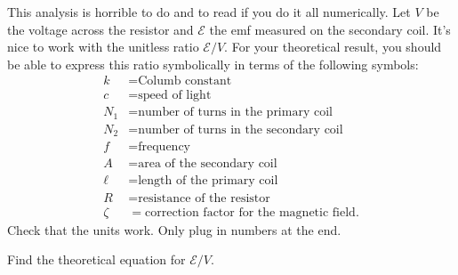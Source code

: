 This analysis is horrible to do and to read if you do it all numerically.
Let $V$ be the voltage across the resistor and $\mathcal{E}$ the emf measured
on the secondary coil. It's nice to work with the unitless ratio $\mathcal{E}/V$.
For your theoretical result, you should be
able to express this ratio symbolically in terms of the following
symbols:
\begin{align*}
 k  &= \text{Columb constant} \\
 c  &= \text{speed of light} \\
 N_1  &= \text{number of turns in the primary coil} \\
 N_2  &= \text{number of turns in the secondary coil} \\
 f  &= \text{frequency} \\
 A  &= \text{area of the secondary coil} \\
 \ell  &= \text{length of the primary coil} \\
 R  &= \text{resistance of the resistor} \\
 \zeta  &= \text{correction factor for the magnetic field}.
\end{align*}
Check that the units work. Only plug in numbers at the end.

\prelab

\prelabquestion Find the theoretical equation for $\mathcal{E}/V$.
